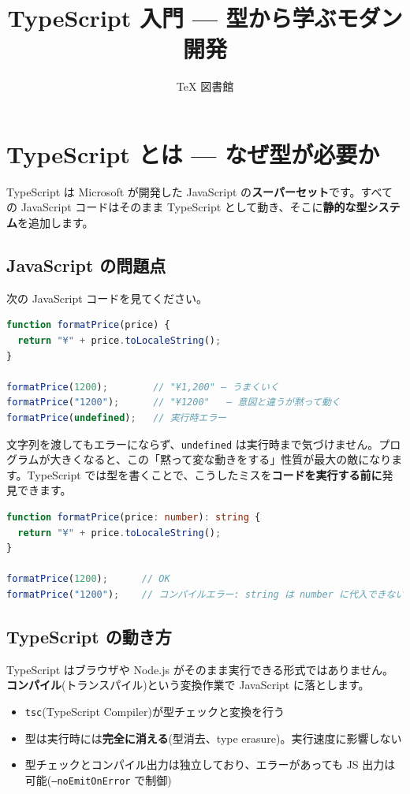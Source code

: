 \documentclass{article}
\title{TypeScript 入門 — 型から学ぶモダン開発}
\author{TeX 図書館}
\begin{document}
\section{TypeScript とは — なぜ型が必要か}

TypeScript は Microsoft が開発した JavaScript の\textbf{スーパーセット}です。すべての JavaScript コードはそのまま TypeScript として動き、そこに\textbf{静的な型システム}を追加します。

\subsection{JavaScript の問題点}

次の JavaScript コードを見てください。

\begin{lstlisting}[language=JavaScript]
function formatPrice(price) {
  return "¥" + price.toLocaleString();
}

formatPrice(1200);        // "¥1,200" — うまくいく
formatPrice("1200");      // "¥1200"   — 意図と違うが黙って動く
formatPrice(undefined);   // 実行時エラー
\end{lstlisting}

文字列を渡してもエラーにならず、\texttt{undefined} は実行時まで気づけません。プログラムが大きくなると、この「黙って変な動きをする」性質が最大の敵になります。TypeScript では型を書くことで、こうしたミスを\textbf{コードを実行する前に}発見できます。

\begin{lstlisting}[language=TypeScript]
function formatPrice(price: number): string {
  return "¥" + price.toLocaleString();
}

formatPrice(1200);      // OK
formatPrice("1200");    // コンパイルエラー: string は number に代入できない
\end{lstlisting}

\subsection{TypeScript の動き方}

TypeScript はブラウザや Node.js がそのまま実行できる形式ではありません。\textbf{コンパイル}(トランスパイル)という変換作業で JavaScript に落とします。

\begin{itemize}
\item \texttt{tsc}(TypeScript Compiler)が型チェックと変換を行う
\item 型は実行時には\textbf{完全に消える}(型消去、type erasure)。実行速度に影響しない
\item 型チェックとコンパイル出力は独立しており、エラーがあっても JS 出力は可能(\texttt{--noEmitOnError} で制御)
\end{itemize}
\end{document}
